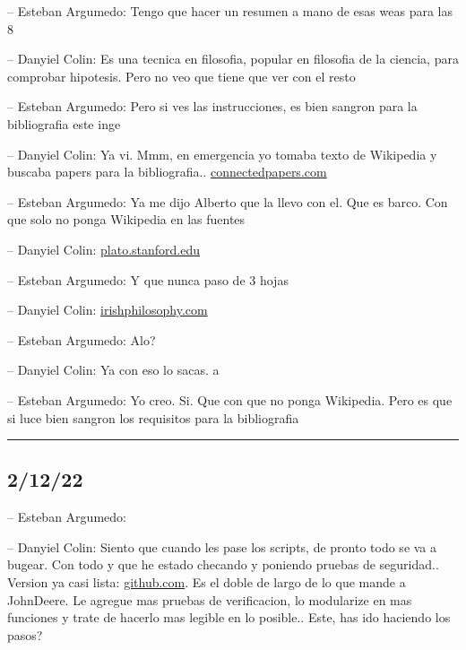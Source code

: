 -- Esteban Argumedo: Tengo que hacer un resumen a mano de esas weas para
las 8

-- Danyiel Colin: Es una tecnica en filosofia, popular en filosofia de
la ciencia, para comprobar hipotesis. Pero no veo que tiene que ver con
el resto

-- Esteban Argumedo: Pero si ves las instrucciones, es bien sangron para
la bibliografia este inge

-- Danyiel Colin: Ya vi. Mmm, en emergencia yo tomaba texto de Wikipedia
y buscaba papers para la bibliografia..
\href{https://www.connectedpapers.com/main/cdabff298e9467de9babf0baad04c19789cde44b/Occam's-razor-is-insufficient-to-infer-the-preferences-of-irrational-agents/graph}{connectedpapers.com}

-- Esteban Argumedo: Ya me dijo Alberto que la llevo con el. Que es
barco. Con que solo no ponga Wikipedia en las fuentes

-- Danyiel Colin:
\href{https://plato.stanford.edu/entries/ockham/\#OckhRazo}{plato.stanford.edu}

-- Esteban Argumedo: Y que nunca paso de 3 hojas

-- Danyiel Colin:
\href{https://www.irishphilosophy.com/2014/05/27/who-sharpened-occams-razor/}{irishphilosophy.com}

-- Esteban Argumedo: Alo?

-- Danyiel Colin: Ya con eso lo sacas. a

-- Esteban Argumedo: Yo creo. Si. Que con que no ponga Wikipedia. Pero
es que si luce bien sangron los requisitos para la bibliografia

\begin{center}\rule{0.5\linewidth}{0.5pt}\end{center}

\hypertarget{section-5}{%
\subsection{2/12/22}\label{section-5}}

-- Esteban Argumedo:

-- Danyiel Colin: Siento que cuando les pase los scripts, de pronto todo
se va a bugear. Con todo y que he estado checando y poniendo pruebas de
seguridad.. Version ya casi lista:
\href{https://github.com/DanEscher98/Courses/blob/main/Setups/fedora35/setup.sh}{github.com}.
Es el doble de largo de lo que mande a JohnDeere. Le agregue mas pruebas
de verificacion, lo modularize en mas funciones y trate de hacerlo mas
legible en lo posible.. Este, has ido haciendo los pasos?

